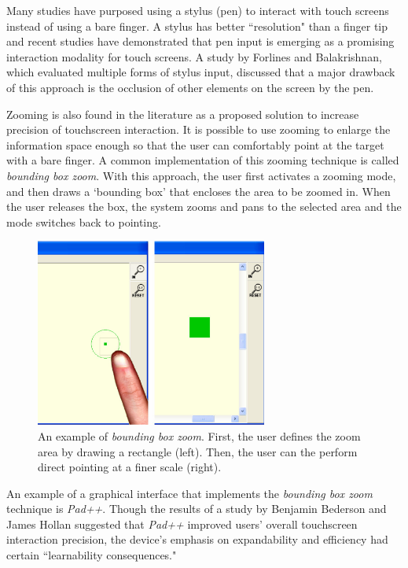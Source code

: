 \documentclass{article}
\begin{document}
Many studies have purposed using a stylus (pen) to interact with touch screens instead of using a bare finger. A stylus has better ``resolution" than a finger tip and recent studies have demonstrated that pen input is emerging as a promising interaction modality for touch screens.\cite{Bi} A study by Forlines and Balakrishnan, which evaluated multiple forms of stylus input, discussed that a major drawback of this approach is the occlusion of other elements on the screen by the pen.\cite{Forlines}

Zooming is also found in the literature as a proposed solution to increase precision of touchscreen interaction. It is possible to use zooming to enlarge the information space enough so that the user can comfortably point at the target with a bare finger. A common implementation of this zooming technique is called \textit{bounding box zoom}.\cite{Albinsson} With this approach, the user first activates a zooming mode, and then draws a `bounding box' that encloses the area to be zoomed in. When the user releases the box, the system zooms and pans to the selected area and the mode switches back to pointing. 

\begin{figure}[ht]
\centering
\includegraphics[width=3in]{zoom.png} 
\caption{An example of \textit{bounding box zoom}. First, the user defines the zoom area by drawing a rectangle (left). Then, the user can the perform direct pointing at a finer scale (right).}
\label{figure-sample}
\end{figure}

An example of a graphical interface that implements the \textit{bounding box zoom} technique is \textit{Pad++}.\cite{Bederson} Though the results of a study by Benjamin Bederson and James Hollan suggested that \textit{Pad++} improved users' overall touchscreen interaction precision, the device's emphasis on expandability and efficiency had certain ``learnability consequences."\cite{Bederson} 
\end{document}
